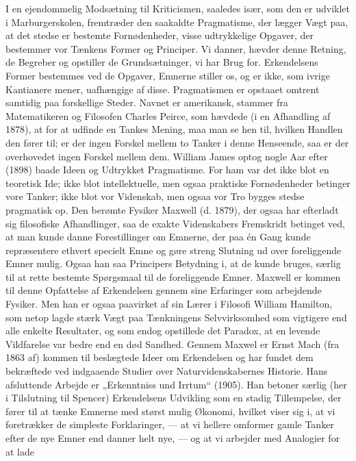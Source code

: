 \documentclass[12pt,a4paper,openany]{book}
\newcommand{\opage}[1]{\marginnote{\footnotesize\textit{[#1]}}}
\begin{document}
I en ejendommelig Modsætning til Kriticismen, saaledes især, som
den er udviklet i Marburgerskolen, fremtræder den saakaldte Pragmatisme,
der lægger Vægt paa, at det stedse er bestemte Fornødenheder,
visse udtrykkelige Opgaver, der bestemmer vor Tænkens Former
og Principer. Vi danner, hævder denne Retning, de Begreber og
opstiller de Grundsætninger, vi har Brug for. Erkendelsens Former
bestemmes ved de Opgaver, Emnerne stiller os, og er ikke, som
ivrige Kantianere mener, uafhængige af disse. Pragmatismen er opstaaet
omtrent samtidig paa forskellige Steder. Navnet er amerikansk,
stammer fra Matematikeren og Filosofen Charles Peirce, som hævdede
(i en Afhandling af 1878), at for at udfinde en Tankes Mening,
maa man se hen til, hvilken Handlen den fører til; er der ingen
Forskel mellem to Tanker i denne Henseende, saa er der overhovedet
ingen Forskel mellem dem. William James optog nogle Aar
efter (1898) baade Ideen og Udtrykket Pragmatisme. For ham var
det ikke blot en teoretisk Ide; ikke blot intellektuelle, men ogsaa
praktiske Fornødenheder betinger vore Tanker; ikke blot vor Videnskab,
men ogsaa vor Tro bygges stedse pragmatisk op. Den berømte
Fysiker Maxwell (d. 1879), der ogsaa har efterladt sig filosofiske
Afhandlinger, saa de exakte Videnskabers Fremskridt betinget ved,
at man kunde danne Forestillinger om Emnerne, der paa én Gang
kunde repræsentere ethvert specielt Emne og gøre streng Slutning
ud over foreliggende Emner mulig. Ogsaa han saa Principers Betydning
i, at de kunde bruges, særlig til at rette bestemte Spørgsmaal
til de foreliggende Emner. Maxwell er kommen til denne Opfattelse
af Erkendelsen gennem sine Erfaringer som arbejdende Fysiker.
Men han er ogsaa paavirket af sin Lærer i Filosofi William Hamilton,
som netop lagde stærk Vægt paa Tænkningens Selvvirksomhed
som vigtigere end alle enkelte Resultater, og som endog opstillede det
Paradox, at en levende Vildfarelse var bedre end en død Sandhed.
\opage{81}Gennem Maxwel er Ernst Mach (fra 1863 af) kommen til beslægtede
Ideer om Erkendelsen og har fundet dem bekræftede ved indgaaende
Studier over Naturvidenskabernes Historie. Hans afsluttende
Arbejde er „Erkenntniss und Irrtum“ (1905). Han betoner særlig
(her i Tilslutning til Spencer) Erkendelsens Udvikling som en stadig
Tillempelse, der fører til at tænke Emnerne med størst mulig Økonomi,
hvilket viser sig i, at vi foretrækker de simpleste Forklaringer,
--- at vi hellere omformer gamle Tanker efter de nye Emner
end danner helt nye, --- og at vi arbejder med Analogier for at lade
\end{document}

